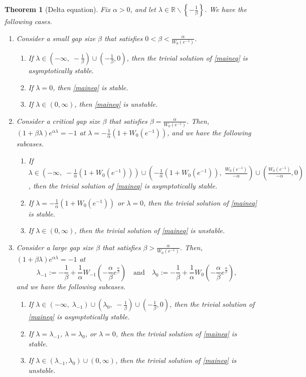 \documentclass[12pt,reqno]{amsart}
\theoremstyle{plain}
\newtheorem{theorem}{Theorem}
\theoremstyle{definition}
\newcommand{\R}{\ensuremath{\mathbb{R}}}
\numberwithin{equation}{section}
\numberwithin{theorem}{section}
\begin{document}
\begin{theorem}[Delta equation]\label{reallambdathm}
Fix $\alpha>0$, and let $\lambda\in\R\backslash\left\{-\frac{1}{\beta}\right\}$. We have the following cases.
\begin{enumerate}
\item Consider a small gap size $\beta$ that satisfies $0<\beta<\frac{\alpha}{W_0(e^{-1})}$.
 \begin{enumerate}
   \item If $\lambda\in\left(-\infty,\; -\frac{1}{\beta}\right)\cup\left(-\frac{1}{\beta},0\right)$, then the trivial solution of \eqref{maineq} is asymptotically stable. 
   \item If $\lambda=0$, then \eqref{maineq} is stable. 
   \item If $\lambda\in\left(0,\infty\right)$, then \eqref{maineq} is unstable.
 \end{enumerate}
\item Consider a critical gap size $\beta$ that satisfies $\beta=\frac{\alpha}{W_0(e^{-1})}$. Then, $(1+\beta\lambda)e^{\alpha\lambda}=-1$ at $\lambda=-\frac{1}{\alpha}\left(1+W_0(e^{-1})\right)$, and we have the following subcases.
 \begin{enumerate}
   \item If $\lambda\in\left(-\infty,\; -\frac{1}{\alpha}\left(1+W_0(e^{-1})\right)\right)\cup\left(-\frac{1}{\alpha}\left(1+W_0(e^{-1})\right),\; \frac{W_0(e^{-1})}{-\alpha}\right)\cup\left(\frac{W_0(e^{-1})}{-\alpha},0\right)$, 
	       then the trivial solution of \eqref{maineq} is asymptotically stable. 
   \item If $\lambda=-\frac{1}{\alpha}\left(1+W_0(e^{-1})\right)$ or $\lambda=0$, then the trivial solution of \eqref{maineq} is stable.
   \item If $\lambda\in(0,\infty)$, then the trivial solution of \eqref{maineq} is unstable.
 \end{enumerate}
\item Consider a large gap size $\beta$ that satisfies $\beta>\frac{\alpha}{W_0(e^{-1})}$. Then, $(1+\beta\lambda)e^{\alpha\lambda}=-1$ at 
 $$ \lambda_{-1}:=-\frac{1}{\beta}+\frac{1}{\alpha}W_{-1}\left(-\frac{\alpha}{\beta}e^{\frac{\alpha}{\beta}}\right) \quad\text{and}\quad 
    \lambda_{0}:=-\frac{1}{\beta}+\frac{1}{\alpha}W_{0}\left(-\frac{\alpha}{\beta}e^{\frac{\alpha}{\beta}}\right), $$ 
		and we have the following subcases.
 \begin{enumerate}
   \item If $\lambda\in\left(-\infty,\; \lambda_{-1}\right)\cup\left(\lambda_{0},\; -\frac{1}{\beta}\right)\cup\left(-\frac{1}{\beta},0\right)$, then the trivial solution 
	       of \eqref{maineq} is asymptotically stable. 
   \item If $\lambda=\lambda_{-1}$, $\lambda=\lambda_{0}$, or $\lambda=0$, then the trivial solution of \eqref{maineq} is stable.
   \item If $\lambda\in\left(\lambda_{-1},\lambda_{0}\right)\cup(0,\infty)$, 
	       then the trivial solution of \eqref{maineq} is unstable.
 \end{enumerate}
\end{enumerate}
\end{theorem}
\end{document}
